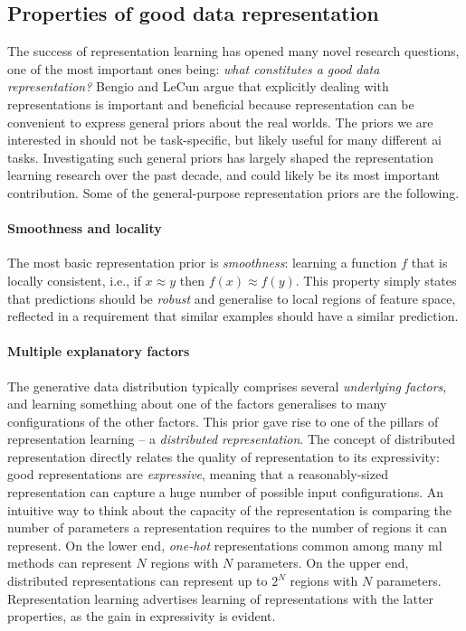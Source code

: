 \subsection{Properties of good data representation}
\label{ch3:sec:properties}


The success of representation learning has opened many novel research questions, one of the most important ones being: \textit{what constitutes a good data representation?}
Bengio and LeCun \cite{Bengio2013RLR} argue that explicitly dealing with representations is important and beneficial because representation can be convenient to express general priors about the real worlds.
The priors we are interested in should not be task-specific, but likely useful for many different \gls{ai} tasks.
Investigating such general priors has largely shaped the representation learning research over the past decade, and could likely be its most important contribution.
Some of the general-purpose representation priors are the following.



\paragraph{\textbf{Smoothness and locality}}
The most basic representation prior is \textit{smoothness}: learning a function $f$ that is locally consistent, i.e., if $ x \approx y$ then $f(x) \approx f(y)$.
This property simply states that predictions should be \textit{robust} and generalise to local regions of feature space, reflected in a requirement that similar examples should have a similar prediction.




\paragraph{\textbf{Multiple explanatory factors}}
The generative data distribution typically comprises several \textit{underlying factors}, and learning something about one of the factors generalises to many configurations of the other factors.
This prior gave rise to one of the pillars of representation learning -- a  \textit{distributed representation}.
The concept of distributed representation directly relates the quality of representation to its expressivity: good representations are \textit{expressive}, meaning that a reasonably-sized representation can capture a huge number of possible input configurations.
An intuitive way to think about the capacity of the representation is comparing the number of parameters a representation requires to the number of regions it can represent.
On the lower end, \textit{one-hot} representations common among many \gls{ml} methods can represent $N$ regions with $N$ parameters.
On the upper end, distributed representations can represent up to $2^N$ regions with $N$ parameters.
Representation learning advertises learning of representations with the latter properties, as the gain in expressivity is evident.



